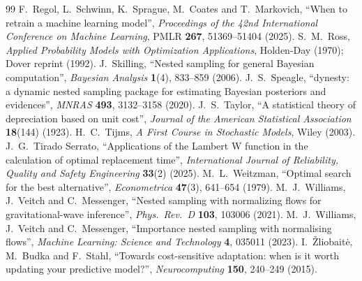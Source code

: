 \documentclass[11pt,a4paper]{article}
\begin{document}
\begin{thebibliography}{99}
 F.~Regol, L.~Schwinn, K.~Sprague, M.~Coates and T.~Markovich, ``When to retrain a machine learning model'', \emph{Proceedings of the 42nd International Conference on Machine Learning}, PMLR \textbf{267}, 51369--51404 (2025).
 S.~M.~Ross, \emph{Applied Probability Models with Optimization Applications}, Holden-Day (1970); Dover reprint (1992).
 J.~Skilling, ``Nested sampling for general Bayesian computation'', \emph{Bayesian Analysis} \textbf{1}(4), 833--859 (2006).
 J.~S.~Speagle, ``dynesty: a dynamic nested sampling package for estimating Bayesian posteriors and evidences'', \emph{MNRAS} \textbf{493}, 3132--3158 (2020).
 J.~S.~Taylor, ``A statistical theory of depreciation based on unit cost'', \emph{Journal of the American Statistical Association} \textbf{18}(144) (1923).
 H.~C.~Tijms, \emph{A First Course in Stochastic Models}, Wiley (2003).
 J.~G.~Tirado Serrato, ``Applications of the Lambert W function in the calculation of optimal replacement time'', \emph{International Journal of Reliability, Quality and Safety Engineering} \textbf{33}(2) (2025).
 M.~L.~Weitzman, ``Optimal search for the best alternative'', \emph{Econometrica} \textbf{47}(3), 641--654 (1979).
 M.~J.~Williams, J.~Veitch and C.~Messenger, ``Nested sampling with normalizing flows for gravitational-wave inference'', \emph{Phys.\ Rev.\ D} \textbf{103}, 103006 (2021).
 M.~J.~Williams, J.~Veitch and C.~Messenger, ``Importance nested sampling with normalising flows'', \emph{Machine Learning: Science and Technology} \textbf{4}, 035011 (2023).
 I.~\v{Z}liobait\.{e}, M.~Budka and F.~Stahl, ``Towards cost-sensitive adaptation: when is it worth updating your predictive model?'', \emph{Neurocomputing} \textbf{150}, 240--249 (2015).
\end{thebibliography}
\end{document}
